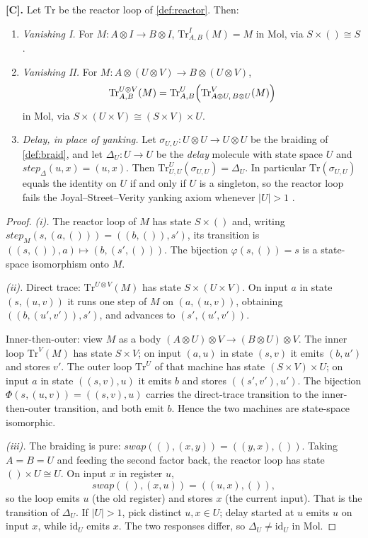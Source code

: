 \begin{theorem}\label{thm:35}
\textbf{[C].} Let $\mathrm{Tr}$ be the reactor loop of
\autoref{def:reactor}. Then:
\begin{enumerate}
\item[(i)] \emph{Vanishing I.} For $M : A \otimes I \to B \otimes I$,
$\mathrm{Tr}^{I}_{A,B} (M) = M$ in Mol, via $S \times () \cong S$.
\item[(ii)] \emph{Vanishing II.} For
$M : A \otimes (U \otimes V) \to B \otimes (U \otimes V)$,
\[
\mathrm{Tr}^{U \otimes V}_{A,B} (M)
= \mathrm{Tr}^{U}_{A,B}\Bigl (
  \mathrm{Tr}^{V}_{A \otimes U,\, B \otimes U} (M) \Bigr)
\]
in Mol, via $S \times (U \times V) \cong (S \times V) \times U$.
\item[(iii)] \emph{Delay, in place of yanking.} Let
$\sigma_{U,U} : U \otimes U \to U \otimes U$ be the braiding of
\autoref{def:braid}, and let $\Delta_U : U \to U$ be the \emph{delay}
molecule with state space $U$ and
$\mathit{step}_{\Delta} (u, x) = (u, x)$. Then
$\mathrm{Tr}^{U}_{U,U} (\sigma_{U,U}) = \Delta_U$. In particular
$\mathrm{Tr} (\sigma_{U,U})$ equals the identity on $U$ if and only if
$U$ is a singleton, so the reactor loop fails the Joyal--Street--Verity
yanking axiom whenever $|U| > 1$ \citep{joyalsv}.
\end{enumerate}
\end{theorem}

\begin{proof}
\emph{(i).} The reactor loop of $M$ has state $S \times ()$ and, writing
$\mathit{step}_M (s, (a, ())) = ((b, ()), s')$, its transition is
$((s, ()), a) \mapsto (b, (s', ()))$. The bijection
$\varphi (s, ()) = s$ is a state-space isomorphism onto $M$.

\emph{(ii).} Direct trace: $\mathrm{Tr}^{U \otimes V} (M)$ has state
$S \times (U \times V)$. On input $a$ in state $(s, (u, v))$ it runs one
step of $M$ on $(a, (u, v))$, obtaining $((b, (u', v')), s')$, and
advances to $(s', (u', v'))$.

Inner-then-outer: view $M$ as a body
$(A \otimes U) \otimes V \to (B \otimes U) \otimes V$. The inner loop
$\mathrm{Tr}^{V} (M)$ has state $S \times V$; on input $(a, u)$ in state
$(s, v)$ it emits $(b, u')$ and stores $v'$. The outer loop
$\mathrm{Tr}^{U}$ of that machine has state $(S \times V) \times U$; on
input $a$ in state $((s, v), u)$ it emits $b$ and stores
$((s', v'), u')$. The bijection
$\Phi (s, (u, v)) = ((s, v), u)$ carries the direct-trace transition to
the inner-then-outer transition, and both emit $b$. Hence the two
machines are state-space isomorphic.

\emph{(iii).} The braiding is pure:
$\mathit{swap} ((), (x, y)) = ((y, x), ())$. Taking $A = B = U$ and
feeding the second factor back, the reactor loop has state $() \times U
\cong U$. On input $x$ in register $u$,
\[
\mathit{swap} ((), (x, u)) = ((u, x), ()),
\]
so the loop emits $u$ (the old register) and stores $x$ (the current
input). That is the transition of $\Delta_U$. If $|U| > 1$, pick
distinct $u, x \in U$; delay started at $u$ emits $u$ on input $x$,
while $\mathrm{id}_U$ emits $x$. The two responses differ, so
$\Delta_U \neq \mathrm{id}_U$ in Mol.
\end{proof}

